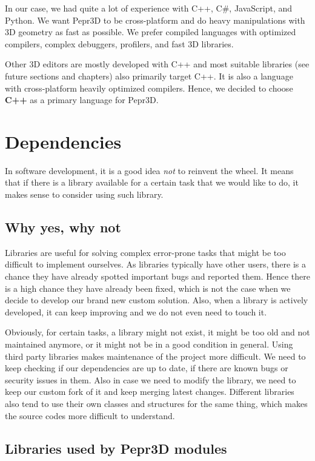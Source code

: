 \medskip

In our case, we had quite a lot of experience with C++, C\#, JavaScript, and Python.
We want Pepr3D to be cross-platform and do heavy manipulations with 3D geometry as fast as possible.
We prefer compiled languages with optimized compilers, complex debuggers, profilers, and fast 3D libraries.

Other 3D editors are mostly developed with C++ and most suitable libraries (see future sections and chapters) also primarily target C++.
It is also a language with cross-platform heavily optimized compilers.
Hence, we decided to choose \textbf{C++} as a primary language for Pepr3D.

\section{Dependencies}

In software development, it is a good idea \emph{not} to reinvent the wheel.
It means that if there is a library available for a certain task that we would like to do, it makes sense to consider using such library.

\subsection{Why yes, why not}

Libraries are useful for solving complex error-prone tasks that might be too difficult to implement ourselves.
As libraries typically have other users, there is a chance they have already spotted important bugs and reported them.
Hence there is a high chance they have already been fixed, which is not the case when we decide to develop our brand new custom solution.
Also, when a library is actively developed, it can keep improving and we do not even need to touch it.

Obviously, for certain tasks, a library might not exist, it might be too old and not maintained anymore, or it might not be in a good condition in general.
Using third party libraries makes maintenance of the project more difficult.
We need to keep checking if our dependencies are up to date, if there are known bugs or security issues in them.
Also in case we need to modify the library, we need to keep our custom fork of it and keep merging latest changes.
Different libraries also tend to use their own classes and structures for the same thing, which makes the source codes more difficult to understand.

\subsection{Libraries used by Pepr3D modules}

